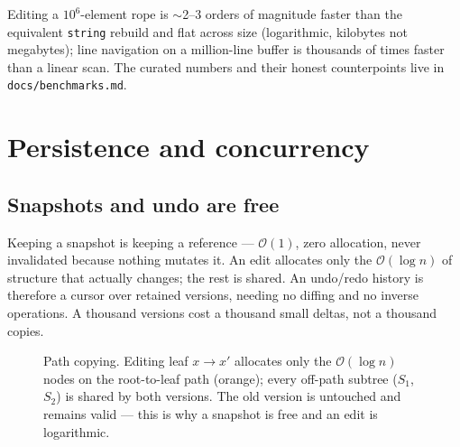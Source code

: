\documentclass[11pt]{article}
\newcommand{\cs}[1]{\lstinline|#1|}
\newcommand{\bigO}{\ensuremath{\mathcal{O}}}
\begin{document}
Editing a $10^6$-element rope is $\sim$2--3 orders of magnitude faster than the equivalent \cs{string}
rebuild and flat across size (logarithmic, kilobytes not megabytes); line navigation on a million-line
buffer is thousands of times faster than a linear scan. The curated numbers and their honest
counterpoints live in \texttt{docs/benchmarks.md}.

\section{Persistence and concurrency}
\label{sec:concurrency}

\subsection{Snapshots and undo are free}

Keeping a snapshot is keeping a reference --- $\bigO(1)$, zero allocation, never invalidated because
nothing mutates it. An edit allocates only the $\bigO(\log n)$ of structure that actually changes; the
rest is shared. An undo/redo history is therefore a cursor over retained versions, needing no diffing and
no inverse operations. A thousand versions cost a thousand small deltas, not a thousand copies.

\begin{figure}[ht]
\centering
{}
\caption{Path copying. Editing leaf $x \to x'$ allocates only the $\bigO(\log n)$ nodes on the
root-to-leaf path (orange); every off-path subtree ($S_1$, $S_2$) is shared by both versions. The old
version is untouched and remains valid --- this is why a snapshot is free and an edit is logarithmic.}
\label{fig:sharing}
\end{figure}
\end{document}
